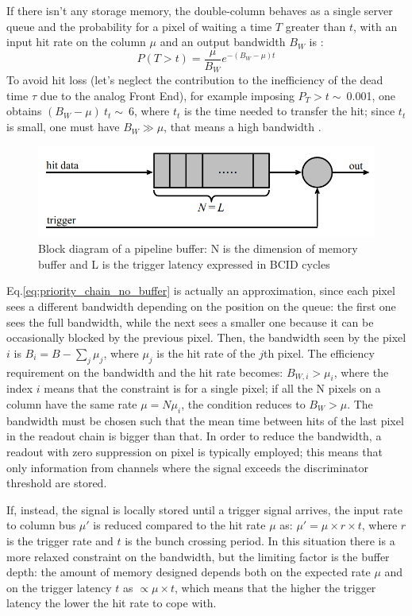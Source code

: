    If there isn't any storage memory, the double-column behaves as a single server queue and the probability for a pixel of waiting a time $T$ greater than $t$, with an input hit rate on the column $\mu$ and an output bandwidth $B_W$ is \cite{Garcia-Review}:
   \begin{equation}
   P(T > t) = \frac{\mu}{B_W} e^{-( B_W-\mu )t}
   \label{eq:priority_chain_no_buffer}
   \end{equation}
   To avoid hit loss (let's neglect the contribution to the inefficiency of the dead time $\tau$ due to the analog Front End), for example imposing $P_T > t\sim\:$0.001, one obtains $(B_W -\mu)\:t_t\sim\:$6, where $t_t$ is the time needed to transfer the hit; since $t_t$ is small, one must have $B_W \gg \mu$, that means a high bandwidth \cite{Garcia-Review}.
   \begin{figure}[h!]
      \centering
      \includegraphics[width=.6\linewidth]{figures/Pixel_detectors/pipeline.png}
      \caption{Block diagram of a pipeline buffer: N is the dimension of memory buffer and L is the trigger latency expressed in BCID cycles}
      \label{fig:pipeline}
   \end{figure}

   Eq.\ref{eq:priority_chain_no_buffer} is actually an approximation, since each pixel sees a different bandwidth depending on the position on the queue: the first one sees the full bandwidth, while the next sees a smaller one because it can be occasionally blocked by the previous pixel. Then, the bandwidth seen by the pixel $i$ is $B_{i} = B - \sum _{j}\mu_{j}$, where $\mu_j$ is the hit rate of the $j$th pixel.
   The efficiency requirement on the bandwidth and the hit rate becomes: $B_{W,i} > \mu_{i}$, where the index $i$ means that the constraint is for a single pixel; if all the N pixels on a column have the same rate $\mu = N\mu_{i}$, the condition reduces to $B_{W} > \mu$.
   The bandwidth must be chosen such that the mean time between hits of the last pixel in the readout chain is bigger than that.
   In order to reduce the bandwidth, a readout with zero suppression on pixel is typically employed; this means that only information from channels where the signal exceeds the discriminator threshold are stored. 

   If, instead, the signal is locally stored until a trigger signal arrives, the input rate to column bus $\mu '$ is reduced compared to the hit rate $\mu$ as: $\mu'=\mu \times r \times t$, where $r$ is the trigger rate and $t$ is the bunch crossing period.
   In this situation there is a more relaxed constraint on the bandwidth, but the limiting factor is the buffer depth: the amount of memory designed depends both on the expected rate $\mu$ and on the trigger latency $t$ as $\propto\mu \times t$, which means that the higher the trigger latency the lower the hit rate to cope with. 

